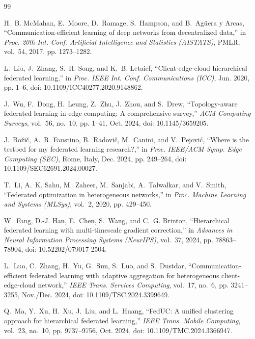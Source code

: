 \documentclass[conference]{IEEEtran}
\begin{document}
\begin{thebibliography}{99}

H.~B. McMahan, E.~Moore, D.~Ramage, S.~Hampson, and B.~Ag\"{u}era y Arcas, ``Communication-efficient learning of deep networks from decentralized data,'' in \textit{Proc. 20th Int. Conf. Artificial Intelligence and Statistics (AISTATS)}, PMLR, vol.~54, 2017, pp. 1273--1282.

L.~Liu, J.~Zhang, S.~H. Song, and K.~B. Letaief, ``Client-edge-cloud hierarchical federated learning,'' in \textit{Proc. IEEE Int. Conf. Communications (ICC)}, Jun. 2020, pp. 1--6, doi: 10.1109/ICC40277.2020.9148862.

J.~Wu, F.~Dong, H.~Leung, Z.~Zhu, J.~Zhou, and S.~Drew, ``Topology-aware federated learning in edge computing: A comprehensive survey,'' \textit{ACM Computing Surveys}, vol.~56, no.~10, pp. 1--41, Oct. 2024, doi: 10.1145/3659205.

J.~Bo\v{z}i\v{c}, A.~R. Faustino, B.~Radovi\v{c}, M.~Canini, and V.~Pejovi\'{c}, ``Where is the testbed for my federated learning research?,'' in \textit{Proc. IEEE/ACM Symp. Edge Computing (SEC)}, Rome, Italy, Dec. 2024, pp. 249--264, doi: 10.1109/SEC62691.2024.00027.

T.~Li, A.~K. Sahu, M.~Zaheer, M.~Sanjabi, A.~Talwalkar, and V.~Smith, ``Federated optimization in heterogeneous networks,'' in \textit{Proc. Machine Learning and Systems (MLSys)}, vol.~2, 2020, pp. 429--450.

W.~Fang, D.-J. Han, E.~Chen, S.~Wang, and C.~G. Brinton, ``Hierarchical federated learning with multi-timescale gradient correction,'' in \textit{Advances in Neural Information Processing Systems (NeurIPS)}, vol.~37, 2024, pp. 78863--78904, doi: 10.52202/079017-2504.

L.~Luo, C.~Zhang, H.~Yu, G.~Sun, S.~Luo, and S.~Dustdar, ``Communication-efficient federated learning with adaptive aggregation for heterogeneous client-edge-cloud network,'' \textit{IEEE Trans. Services Computing}, vol.~17, no.~6, pp. 3241--3255, Nov./Dec. 2024, doi: 10.1109/TSC.2024.3399649.

Q.~Ma, Y.~Xu, H.~Xu, J.~Liu, and L.~Huang, ``FedUC: A unified clustering approach for hierarchical federated learning,'' \textit{IEEE Trans. Mobile Computing}, vol.~23, no.~10, pp. 9737--9756, Oct. 2024, doi: 10.1109/TMC.2024.3366947.


\end{thebibliography}
\end{document}
